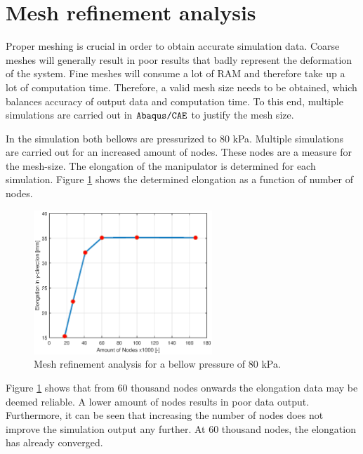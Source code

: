 \label{app:chap3}


\section{Mesh refinement analysis}

Proper meshing is crucial in order to obtain accurate simulation data. Coarse meshes will generally result in poor results that badly represent the deformation of the system. Fine meshes will consume a lot of RAM and therefore take up a lot of computation time. Therefore, a valid mesh size needs to be obtained, which balances accuracy of output data and computation time. To this end, multiple simulations are carried out in $\verb+Abaqus/CAE+$ to justify the mesh size.

In the simulation both bellows are pressurized to $80$ kPa. Multiple simulations are carried out for an increased amount of nodes. These nodes are a measure for the mesh-size. The elongation of the manipulator is determined for each simulation. Figure \ref{fig3:meshrefinement} shows the determined elongation as a function of number of nodes.

\begin{figure}[H]
    \centering
    \includegraphics[width = 0.6\textwidth]{Figures/Chapter2/MeshRefinement.eps}
    \caption{Mesh refinement analysis for a bellow pressure of $80$ kPa.}
    \label{fig3:meshrefinement}
\end{figure}


Figure \ref{fig3:meshrefinement} shows that from 60 thousand nodes onwards the elongation data may be deemed reliable. A lower amount of nodes results in poor data output. Furthermore, it can be seen that increasing the number of nodes does not improve the simulation output any further. At 60 thousand nodes, the elongation has already converged.



